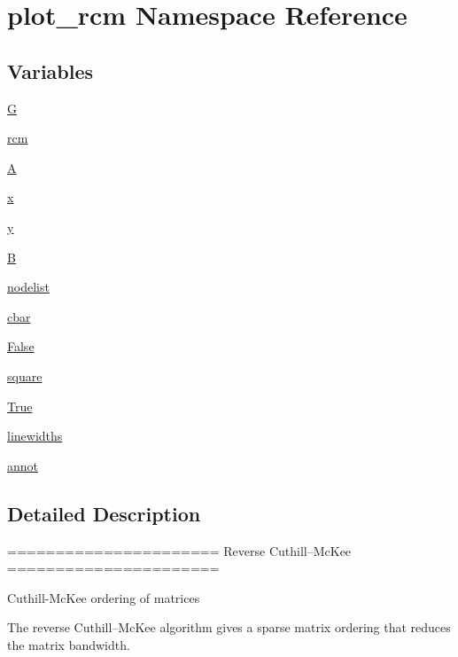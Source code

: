 \hypertarget{namespaceplot__rcm}{}\section{plot\+\_\+rcm Namespace Reference}
\label{namespaceplot__rcm}
\subsection*{Variables}
\begin{DoxyCompactItemize}
\item 
\hyperlink{namespaceplot__rcm_ab09fd50b0e9507cc510118def558b1dd}{G}
\item 
\hyperlink{namespaceplot__rcm_a7494c9685039ff30d550a196fb23a067}{rcm}
\item 
\hyperlink{namespaceplot__rcm_ae495ff50f03e65bef06be76f3b06dd81}{A}
\item 
\hyperlink{namespaceplot__rcm_a1f3cde8f38bc7928d92d6afc51c69cf3}{x}
\item 
\hyperlink{namespaceplot__rcm_a96a70910115eef0c354ab1999dd4d1e0}{y}
\item 
\hyperlink{namespaceplot__rcm_a8c3b2a50fe9f5d3213a99b9e716193f0}{B}
\item 
\hyperlink{namespaceplot__rcm_ad9496db6c0164c9ba23e75847e9b46be}{nodelist}
\item 
\hyperlink{namespaceplot__rcm_a3cf0323365da0a116e64aa4965622f53}{cbar}
\item 
\hyperlink{namespaceplot__rcm_a4115af8fd0a3297606a763427ae2e819}{False}
\item 
\hyperlink{namespaceplot__rcm_ae7ee881a1afcaf593945dfc052f5ed65}{square}
\item 
\hyperlink{namespaceplot__rcm_a7dc61cb0b711ffa3f11d1039850372ab}{True}
\item 
\hyperlink{namespaceplot__rcm_a981810fc48df01b575ff4ef268df8014}{linewidths}
\item 
\hyperlink{namespaceplot__rcm_a1e309164c3788fe431553fef42fb9b9c}{annot}
\end{DoxyCompactItemize}


\subsection{Detailed Description}
\begin{DoxyVerb}======================
Reverse Cuthill--McKee
======================

Cuthill-McKee ordering of matrices

The reverse Cuthill--McKee algorithm gives a sparse matrix ordering that
reduces the matrix bandwidth.
\end{DoxyVerb}
 

